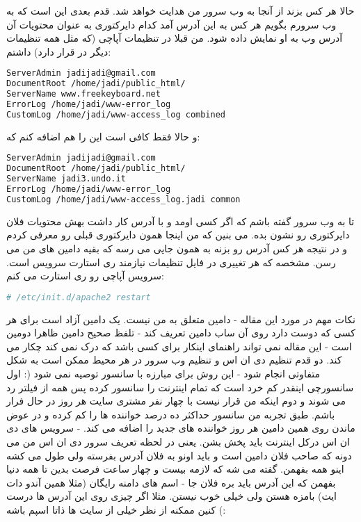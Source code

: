 حالا هر کس بزند  از آنجا به وب سرور من هدایت خواهد شد. قدم بعدی این است که به وب سرورم بگویم هر کس به این آدرس آمد کدام دایرکتوری به عنوان محتویات آن آدرس وب به او نمایش داده شود. من قبلا در تنظیمات آپاچی (که مثل همه تنظیمات دیگر در
 قرار دارد) داشتم:
\begin{latin}
\begin{lstlisting}[language=bash,basicstyle=\ttfamily,linewidth=12cm]
ServerAdmin jadijadi@gmail.com
DocumentRoot /home/jadi/public_html/
ServerName www.freekeyboard.net
ErrorLog /home/jadi/www-error_log
CustomLog /home/jadi/www-access_log combined
\end{lstlisting}
\end{latin}
و حالا فقط کافی است این را هم اضافه کنم که:
\begin{latin}
\begin{lstlisting}[language=bash,basicstyle=\ttfamily,linewidth=12cm]
ServerAdmin jadijadi@gmail.com
DocumentRoot /home/jadi/public_html/
ServerName jadi3.undo.it
ErrorLog /home/jadi/www-error_log
CustomLog /home/jadi/www-access_log.jadi common
\end{lstlisting}
\end{latin}
تا به وب سرور گفته باشم که اگر کسی اومد و با آدرس  کار داشت بهش محتویات فلان دایرکتوری رو نشون بده. می بنین که من اینجا همون دایرکتوری قبلی رو معرفی کردم و در نتیجه هر کس آدرس
\href{http://jadi3.undo.it}{}
رو بزنه به همون جایی می رسه که بقیه دامین های من می رسن. مشخصه که هر تغییری در فایل تنظیمات نیازمند ری استارت سرویس است. سرویس آپاچی رو ری استارت می کنم:
\begin{latin}
\begin{lstlisting}[language=bash,basicstyle=\ttfamily,linewidth=12cm]
# /etc/init.d/apache2 restart
\end{lstlisting}
\end{latin}
نکات مهم در مورد این مقاله
- دامین  متعلق به من نیست. یک دامین آزاد است برای هر کسی که دوست دارد روی آن ساب دامین تعریف کند
- تلفظ صحیح دامین ظاهرا دومین است
- این مقاله نمی تواند راهنمای اینکار برای کسی باشد که درک نمی کند چکار می کند. دو قدم تنظیم دی ان اس و تنظیم وب سرور در هر محیط ممکن است به شکل متفاوتی انجام شود
- این روش برای مبارزه با سانسور توصیه نمی شود (: اول سانسورچی اینقدر کم خرد است که تمام اینترنت را سانسور کرده پس همه از فیلتر رد می شوند و دوم اینکه من قرار نیست با چهار نفر مشتری سایت هر روز در حال فرار باشم. طبق تجربه من سانسور حداکثر ده درصد خواننده ها را کم کرده و در عوض ماندن روی همین دامین هر روز خواننده های جدید را اضافه می کند.
- سرویس های دی ان اس درکل اینترنت باید پخش بشن. یعنی در لحظه تعریف سرور دی ان اس من می دونه که صاحب فلان دامین است و باید اونو به فلان آدرس بفرسته ولی طول می کشه اینو همه بفهمن. گفته می شه که لازمه بیست و چهار ساعت فرصت بدین تا همه دنیا بفهمن که این آدرس باید بره فلان جا
- اسم های دامنه رایگان (مثلا همین آندو دات ایت) بامزه هستن ولی خیلی خوب نیستن. مثلا اگر چیزی روی این آدرس ها درست کنین ممکنه از نظر خیلی از سایت ها ذاتا اسپم باشه (:
	